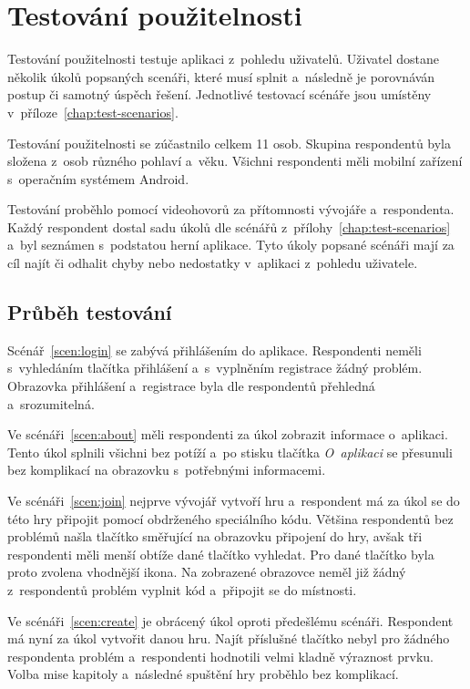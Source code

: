 \section{Testování použitelnosti}
\label{sec:usability}

Testování použitelnosti testuje aplikaci z~pohledu uživatelů.
Uživatel dostane několik úkolů popsaných scenáři,
které musí splnit a~následně je porovnáván postup či samotný úspěch řešení.
Jednotlivé testovací scénáře jsou umístěny v~příloze~\ref{chap:test-scenarios}.

Testování použitelnosti se zúčastnilo celkem 11 osob.
Skupina respondentů byla složena z~osob různého pohlaví a~věku.
Všichni respondenti měli mobilní zařízení s~operačním systémem Android.

Testování proběhlo pomocí videohovorů za přítomnosti vývojáře a~respondenta.
Každý respondent dostal sadu úkolů dle scénářů
z~přílohy~\ref{chap:test-scenarios}
a~byl seznámen s~podstatou herní aplikace.
Tyto úkoly popsané scénáři mají za cíl najít či odhalit chyby nebo nedostatky
v~aplikaci z~pohledu uživatele.

\subsection{Průběh testování}

Scénář~\ref{scen:login} se zabývá přihlášením do aplikace.
Respondenti neměli s~vyhledáním tlačítka přihlášení
a~s~vyplněním registrace žádný problém.
Obrazovka přihlášení a~registrace byla dle respondentů přehledná a~srozumitelná.

Ve scénáři~\ref{scen:about} měli respondenti za úkol zobrazit informace
o~aplikaci.
Tento úkol splnili všichni bez potíží a~po stisku tlačítka \emph{O~aplikaci}
se přesunuli bez komplikací na obrazovku s~potřebnými informacemi.

Ve scénáři~\ref{scen:join} nejprve vývojář vytvoří hru a~respondent má za úkol
se do této hry připojit pomocí obdrženého speciálního kódu.
Většina respondentů bez problémů našla tlačítko směřující na obrazovku připojení
do hry,
avšak tři respondenti měli menší obtíže dané tlačítko vyhledat.
Pro dané tlačítko byla proto zvolena vhodnější ikona.
Na zobrazené obrazovce neměl již žádný z~respondentů problém vyplnit kód
a~připojit se do místnosti.

Ve scénáři~\ref{scen:create} je obrácený úkol oproti předešlému scénáři.
Respondent má nyní za úkol vytvořit danou hru.
Najít příslušné tlačítko nebyl pro žádného respondenta problém
a~respondenti hodnotili velmi kladně výraznost prvku.
Volba mise kapitoly a~následné spuštění hry proběhlo bez komplikací.

